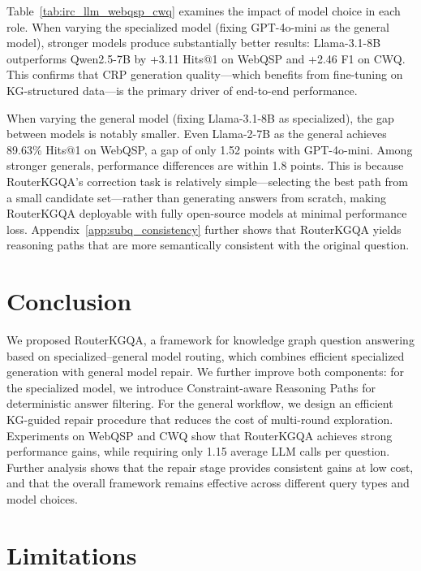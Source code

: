 \documentclass[11pt]{article}
\begin{document}
Table~\ref{tab:irc_llm_webqsp_cwq} examines the impact of model choice in each role. When varying the specialized model (fixing GPT-4o-mini as the general model), stronger models produce substantially better results: Llama-3.1-8B outperforms Qwen2.5-7B by +3.11 Hits@1 on WebQSP and +2.46 F1 on CWQ. This confirms that CRP generation quality---which benefits from fine-tuning on KG-structured data---is the primary driver of end-to-end performance.

When varying the general model (fixing Llama-3.1-8B as specialized), the gap between models is notably smaller. Even Llama-2-7B as the general achieves 89.63\% Hits@1 on WebQSP, a gap of only 1.52 points with GPT-4o-mini. Among stronger generals, performance differences are within 1.8 points. This is because RouterKGQA's correction task is relatively simple---selecting the best path from a small candidate set---rather than generating answers from scratch, making RouterKGQA deployable with fully open-source models at minimal performance loss. Appendix~\ref{app:subq_consistency} further shows that RouterKGQA yields reasoning paths that are more semantically consistent with the original question.


\section{Conclusion}
\label{sec:conclusion}

We proposed RouterKGQA, a framework for knowledge graph question answering based on specialized--general model routing, which combines efficient specialized generation with general model repair. We further improve both components: for the specialized model, we introduce Constraint-aware Reasoning Paths for deterministic answer filtering. For the general workflow, we design an efficient KG-guided repair procedure that reduces the cost of multi-round exploration. Experiments on WebQSP and CWQ show that RouterKGQA achieves strong performance gains, while requiring only 1.15 average LLM calls per question. Further analysis shows that the repair stage provides consistent gains at low cost, and that the overall framework remains effective across different query types and model choices.


\section*{Limitations}
\end{document}
